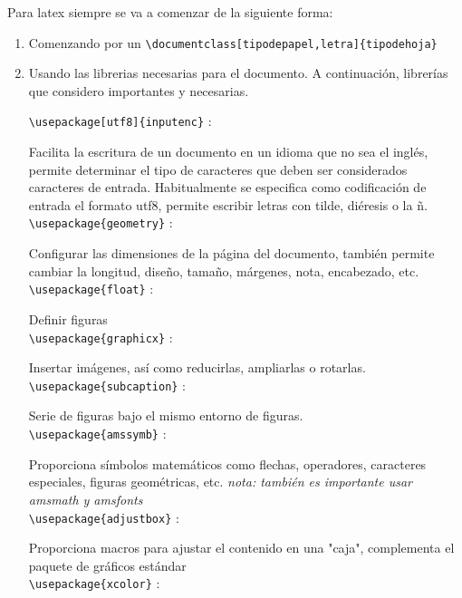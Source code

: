 \documentclass[a4paper,12pt]{article}
\begin{document}
Para latex siempre se va a comenzar de la siguiente forma:
\begin{enumerate}
    \item Comenzando por un \verb|\documentclass[tipodepapel,letra]{tipodehoja}|
    \item  Usando las librerias necesarias para el documento. A continuación, librerías que considero importantes y necesarias.
\begin{center}
    \verb|\usepackage[utf8]{inputenc}| :
    
    Facilita la escritura de un documento en un idioma que no sea el inglés, permite determinar el tipo de caracteres que deben ser considerados caracteres de entrada. Habitualmente se especifica como codificación de entrada el formato utf8, permite escribir letras con tilde, diéresis o la ñ.
    \vspace{0.5cm}\\
    \verb|\usepackage{geometry}| :
    
    Configurar las dimensiones de la página del documento, también permite cambiar la longitud, diseño, tamaño, márgenes, nota, encabezado, etc. 
    \vspace{0.5cm}\\
    \verb|\usepackage{float}| :
    
    Definir figuras
    \vspace{0.5cm}\\
    \verb|\usepackage{graphicx}| :
    
    Insertar imágenes, así como reducirlas, ampliarlas o rotarlas.
    \vspace{0.5cm}\\
    \verb|\usepackage{subcaption}| :
    
    Serie de figuras bajo el mismo entorno de figuras. 
    \vspace{0.5cm}\\
    \verb|\usepackage{amssymb}| : 
    
    Proporciona símbolos matemáticos como flechas, operadores, caracteres especiales, figuras geométricas, etc. \textit{nota: también es importante usar amsmath y amsfonts}
    \vspace{0.5cm}\\
    \verb|\usepackage{adjustbox}| :

    Proporciona macros para ajustar el contenido en una "caja", complementa el paquete de gráficos estándar
    \vspace{0.5cm}\\
    \verb|\usepackage{xcolor}| : 


\end{center}
\end{enumerate}
\end{document}
